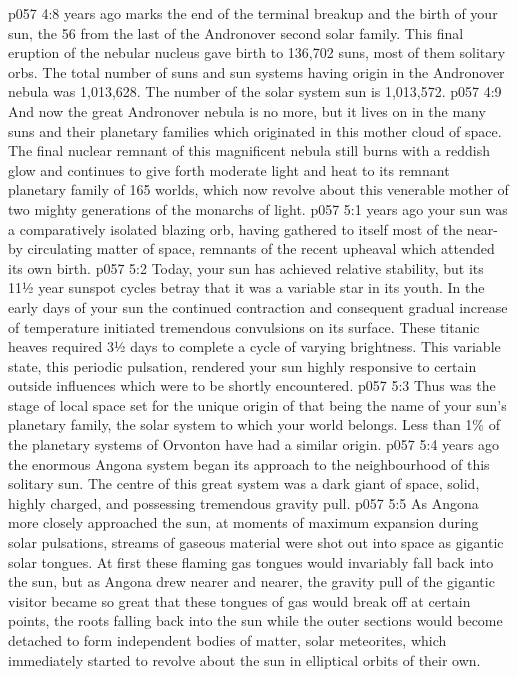 \vs p057 4:8 \pc {} years ago marks the end of the terminal breakup and the birth of your sun, the 56 from the last of the Andronover second solar family. This final eruption of the nebular nucleus gave birth to 136,702 suns, most of them solitary orbs. The total number of suns and sun systems having origin in the Andronover nebula was 1,013,628. The number of the solar system sun is 1,013,572.
\vs p057 4:9 And now the great Andronover nebula is no more, but it lives on in the many suns and their planetary families which originated in this mother cloud of space. The final nuclear remnant of this magnificent nebula still burns with a reddish glow and continues to give forth moderate light and heat to its remnant planetary family of 165 worlds, which now revolve about this venerable mother of two mighty generations of the monarchs of light.
\vs p057 5:1  years ago your sun was a comparatively isolated blazing orb, having gathered to itself most of the near-by circulating matter of space, remnants of the recent upheaval which attended its own birth.
\vs p057 5:2 Today, your sun has achieved relative stability, but its 11½ year sunspot cycles betray that it was a variable star in its youth. In the early days of your sun the continued contraction and consequent gradual increase of temperature initiated tremendous convulsions on its surface. These titanic heaves required 3½ days to complete a cycle of varying brightness. This variable state, this periodic pulsation, rendered your sun highly responsive to certain outside influences which were to be shortly encountered.
\vs p057 5:3 Thus was the stage of local space set for the unique origin of  that being the name of your sun’s planetary family, the solar system to which your world belongs. Less than 1\% of the planetary systems of Orvonton have had a similar origin.
\vs p057 5:4 \pc {} years ago the enormous Angona system began its approach to the neighbourhood of this solitary sun. The centre of this great system was a dark giant of space, solid, highly charged, and possessing tremendous gravity pull.
\vs p057 5:5 As Angona more closely approached the sun, at moments of maximum expansion during solar pulsations, streams of gaseous material were shot out into space as gigantic solar tongues. At first these flaming gas tongues would invariably fall back into the sun, but as Angona drew nearer and nearer, the gravity pull of the gigantic visitor became so great that these tongues of gas would break off at certain points, the roots falling back into the sun while the outer sections would become detached to form independent bodies of matter, solar meteorites, which immediately started to revolve about the sun in elliptical orbits of their own.
